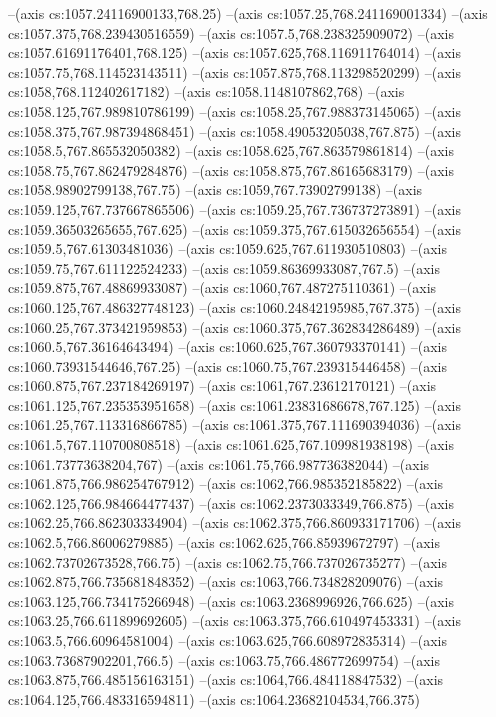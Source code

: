 --(axis cs:1057.24116900133,768.25)
--(axis cs:1057.25,768.241169001334)
--(axis cs:1057.375,768.239430516559)
--(axis cs:1057.5,768.238325909072)
--(axis cs:1057.61691176401,768.125)
--(axis cs:1057.625,768.116911764014)
--(axis cs:1057.75,768.114523143511)
--(axis cs:1057.875,768.113298520299)
--(axis cs:1058,768.112402617182)
--(axis cs:1058.1148107862,768)
--(axis cs:1058.125,767.989810786199)
--(axis cs:1058.25,767.988373145065)
--(axis cs:1058.375,767.987394868451)
--(axis cs:1058.49053205038,767.875)
--(axis cs:1058.5,767.865532050382)
--(axis cs:1058.625,767.863579861814)
--(axis cs:1058.75,767.862479284876)
--(axis cs:1058.875,767.86165683179)
--(axis cs:1058.98902799138,767.75)
--(axis cs:1059,767.73902799138)
--(axis cs:1059.125,767.737667865506)
--(axis cs:1059.25,767.736737273891)
--(axis cs:1059.36503265655,767.625)
--(axis cs:1059.375,767.615032656554)
--(axis cs:1059.5,767.61303481036)
--(axis cs:1059.625,767.611930510803)
--(axis cs:1059.75,767.611122524233)
--(axis cs:1059.86369933087,767.5)
--(axis cs:1059.875,767.48869933087)
--(axis cs:1060,767.487275110361)
--(axis cs:1060.125,767.486327748123)
--(axis cs:1060.24842195985,767.375)
--(axis cs:1060.25,767.373421959853)
--(axis cs:1060.375,767.362834286489)
--(axis cs:1060.5,767.36164643494)
--(axis cs:1060.625,767.360793370141)
--(axis cs:1060.73931544646,767.25)
--(axis cs:1060.75,767.239315446458)
--(axis cs:1060.875,767.237184269197)
--(axis cs:1061,767.23612170121)
--(axis cs:1061.125,767.235353951658)
--(axis cs:1061.23831686678,767.125)
--(axis cs:1061.25,767.113316866785)
--(axis cs:1061.375,767.111690394036)
--(axis cs:1061.5,767.110700808518)
--(axis cs:1061.625,767.109981938198)
--(axis cs:1061.73773638204,767)
--(axis cs:1061.75,766.987736382044)
--(axis cs:1061.875,766.986254767912)
--(axis cs:1062,766.985352185822)
--(axis cs:1062.125,766.984664477437)
--(axis cs:1062.2373033349,766.875)
--(axis cs:1062.25,766.862303334904)
--(axis cs:1062.375,766.860933171706)
--(axis cs:1062.5,766.86006279885)
--(axis cs:1062.625,766.85939672797)
--(axis cs:1062.73702673528,766.75)
--(axis cs:1062.75,766.737026735277)
--(axis cs:1062.875,766.735681848352)
--(axis cs:1063,766.734828209076)
--(axis cs:1063.125,766.734175266948)
--(axis cs:1063.2368996926,766.625)
--(axis cs:1063.25,766.611899692605)
--(axis cs:1063.375,766.610497453331)
--(axis cs:1063.5,766.60964581004)
--(axis cs:1063.625,766.608972835314)
--(axis cs:1063.73687902201,766.5)
--(axis cs:1063.75,766.486772699754)
--(axis cs:1063.875,766.485156163151)
--(axis cs:1064,766.484118847532)
--(axis cs:1064.125,766.483316594811)
--(axis cs:1064.23682104534,766.375)
